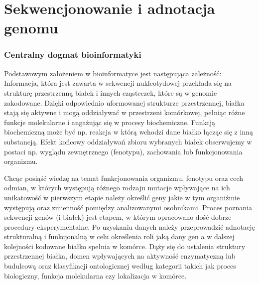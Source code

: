 \chapter{Sekwencjonowanie i adnotacja genomu}
\label{section:sekwencjonowanie_i_adnotacja}

\subsection*{Centralny dogmat bioinformatyki}
Podstawowym założeniem w bioinformatyce jest następująca zależność:
Informacja, która jest zawarta w sekwencji nukleotydowej przekłada się na strukturę przestrzenną białek i innych cząsteczek, które są w genomie zakodowane. 
Dzięki odpowiednio uformowanej strukturze przestrzennej, białka stają się aktywne i mogą oddziaływać w przestrzeni komórkowej, pełniąc różne funkcje molekularne i angażując się w procesy biochemiczne. 
Funkcją biochemiczną może być np. reakcja w którą wchodzi dane białko łącząc się z inną substancją. 
Efekt końcowy oddziaływań zbioru wybranych białek obserwujemy w postaci np. wyglądu zewnętrznego (fenotypu), zachowania lub funkcjonowania organizmu.

Chcąc posiąść wiedzę na temat funkcjonowania organizmu, fenotypu oraz cech odmian, w których występują różnego rodzaju mutacje wpływające na ich unikatowość w pierwszym etapie należy określić geny jakie w tym organiźmie występują oraz zmienność pomiędzy analizowanymi osobnikami.
Proces poznania sekwencji genów (i białek) jest etapem, w którym opracowano dość dobrze procedury eksperymentalne. 
Po uzyskaniu danych należy przeprowadzić adnotację strukturalną i funkcjonalną w celu określenia roli jaką dany gen a w dalszej kolejności kodowane białko spełnia w komórce. 
Dąży się do ustalenia struktury przestrzennej białka, domen wpływających na aktywność enzymatyczną lub budulcową oraz klasyfikacji ontologicznej według kategorii takich jak proces biologiczny, funkcja molekularna czy lokalizacja w komórce.

